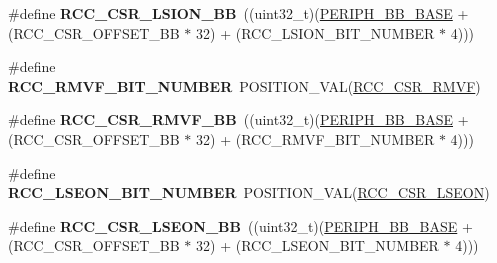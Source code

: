 \begin{DoxyCompactItemize}
\item 
\hypertarget{group___r_c_c___bit_address___alias_region_gac34a2d63deae3efc65e66f8fb3c26dae}{\#define {\bfseries R\-C\-C\-\_\-\-C\-S\-R\-\_\-\-L\-S\-I\-O\-N\-\_\-\-B\-B}~((uint32\-\_\-t)(\hyperlink{group___peripheral__memory__map_gaed7efc100877000845c236ccdc9e144a}{P\-E\-R\-I\-P\-H\-\_\-\-B\-B\-\_\-\-B\-A\-S\-E} + (R\-C\-C\-\_\-\-C\-S\-R\-\_\-\-O\-F\-F\-S\-E\-T\-\_\-\-B\-B $\ast$ 32) + (R\-C\-C\-\_\-\-L\-S\-I\-O\-N\-\_\-\-B\-I\-T\-\_\-\-N\-U\-M\-B\-E\-R $\ast$ 4)))}\label{group___r_c_c___bit_address___alias_region_gac34a2d63deae3efc65e66f8fb3c26dae}

\item 
\hypertarget{group___r_c_c___bit_address___alias_region_ga6cd8836230fcbaf491e9713233690611}{\#define {\bfseries R\-C\-C\-\_\-\-R\-M\-V\-F\-\_\-\-B\-I\-T\-\_\-\-N\-U\-M\-B\-E\-R}~P\-O\-S\-I\-T\-I\-O\-N\-\_\-\-V\-A\-L(\hyperlink{group___peripheral___registers___bits___definition_gafc26c5996b14005a70afbeaa29aae716}{R\-C\-C\-\_\-\-C\-S\-R\-\_\-\-R\-M\-V\-F})}\label{group___r_c_c___bit_address___alias_region_ga6cd8836230fcbaf491e9713233690611}

\item 
\hypertarget{group___r_c_c___bit_address___alias_region_ga40f8ee2c5fa801d0b72ae230578dd77b}{\#define {\bfseries R\-C\-C\-\_\-\-C\-S\-R\-\_\-\-R\-M\-V\-F\-\_\-\-B\-B}~((uint32\-\_\-t)(\hyperlink{group___peripheral__memory__map_gaed7efc100877000845c236ccdc9e144a}{P\-E\-R\-I\-P\-H\-\_\-\-B\-B\-\_\-\-B\-A\-S\-E} + (R\-C\-C\-\_\-\-C\-S\-R\-\_\-\-O\-F\-F\-S\-E\-T\-\_\-\-B\-B $\ast$ 32) + (R\-C\-C\-\_\-\-R\-M\-V\-F\-\_\-\-B\-I\-T\-\_\-\-N\-U\-M\-B\-E\-R $\ast$ 4)))}\label{group___r_c_c___bit_address___alias_region_ga40f8ee2c5fa801d0b72ae230578dd77b}

\item 
\hypertarget{group___r_c_c___bit_address___alias_region_ga16e388a406aa93969e2713dd2e0d43e7}{\#define {\bfseries R\-C\-C\-\_\-\-L\-S\-E\-O\-N\-\_\-\-B\-I\-T\-\_\-\-N\-U\-M\-B\-E\-R}~P\-O\-S\-I\-T\-I\-O\-N\-\_\-\-V\-A\-L(\hyperlink{group___peripheral___registers___bits___definition_gac5e71f3e06f010bbf7592571e541869a}{R\-C\-C\-\_\-\-C\-S\-R\-\_\-\-L\-S\-E\-O\-N})}\label{group___r_c_c___bit_address___alias_region_ga16e388a406aa93969e2713dd2e0d43e7}

\item 
\hypertarget{group___r_c_c___bit_address___alias_region_gab255fbf335d208ed8255c67fb80b84b1}{\#define {\bfseries R\-C\-C\-\_\-\-C\-S\-R\-\_\-\-L\-S\-E\-O\-N\-\_\-\-B\-B}~((uint32\-\_\-t)(\hyperlink{group___peripheral__memory__map_gaed7efc100877000845c236ccdc9e144a}{P\-E\-R\-I\-P\-H\-\_\-\-B\-B\-\_\-\-B\-A\-S\-E} + (R\-C\-C\-\_\-\-C\-S\-R\-\_\-\-O\-F\-F\-S\-E\-T\-\_\-\-B\-B $\ast$ 32) + (R\-C\-C\-\_\-\-L\-S\-E\-O\-N\-\_\-\-B\-I\-T\-\_\-\-N\-U\-M\-B\-E\-R $\ast$ 4)))}\label{group___r_c_c___bit_address___alias_region_gab255fbf335d208ed8255c67fb80b84b1}


\end{DoxyCompactItemize}
